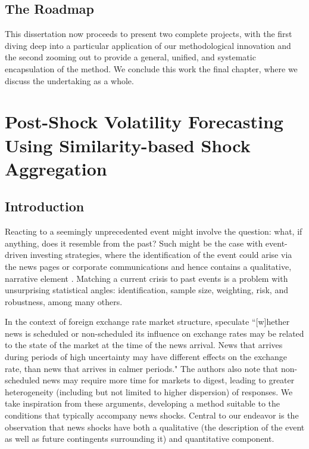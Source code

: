 \documentclass{uiucthesis2021}
\theoremstyle{definition}
\begin{document}
\section{The Roadmap}
This dissertation now proceeds to present two complete projects, with the first diving deep into a particular application of our methodological innovation and the second zooming out to provide a general, unified, and systematic encapsulation of the method.  We conclude this work the final chapter, where we discuss the undertaking as a whole.

\chapter{Post-Shock Volatility Forecasting Using Similarity-based Shock Aggregation}

\section{Introduction}

Reacting to a seemingly unprecedented event might involve the question: what, if anything, does it resemble from the past?  Such might be the case with event-driven investing strategies, where the identification of the event could arise via the news pages or corporate communications and hence contains a qualitative, narrative element \parencite[][]{Kenton}.  Matching a current crisis to past events is a problem with unsurprising statistical angles: identification, sample size, weighting, risk, and robustness, among many others.  

In the context of foreign exchange rate market structure, \cite[][]{dominguez2006defines} speculate ``[w]hether news is scheduled or non-scheduled its influence on exchange rates may be related to the state of the market at the time of the news arrival.  News that arrives during periods of high uncertainty may have different effects on the exchange rate, than news that arrives in calmer periods." The authors also note that non-scheduled news may require more time for markets to digest, leading to greater heterogeneity (including but not limited to higher dispersion) of responses.  We take inspiration from these arguments, developing a method suitable to the conditions that typically accompany news shocks.  Central to our endeavor is the observation that news shocks have both a qualitative (the description of the event as well as future contingents surrounding it) and quantitative component.%
\end{document}

